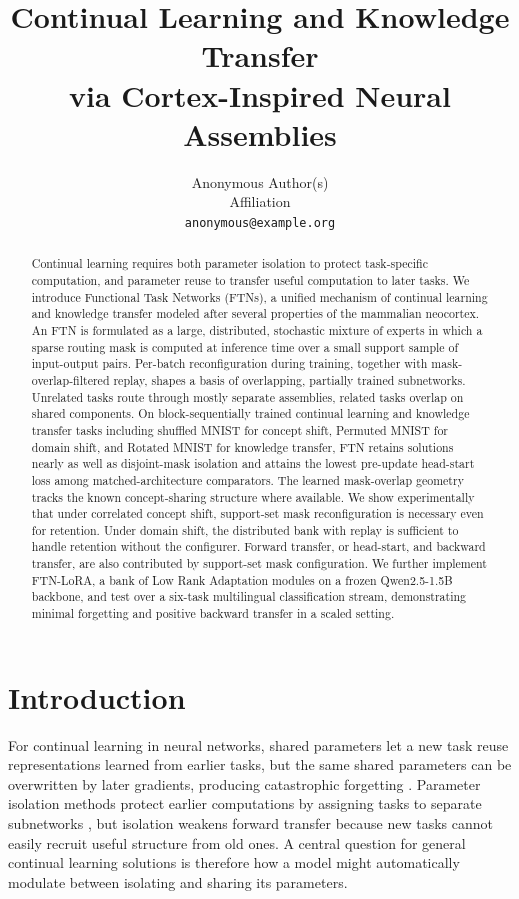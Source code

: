 \documentclass{article}
\title{Continual Learning and Knowledge Transfer\\ via Cortex-Inspired Neural Assemblies}
\author{%
  Anonymous Author(s)\\
  Affiliation\\
  \texttt{anonymous@example.org}\\
}
\begin{document}
\maketitle

\begin{abstract}
Continual learning requires both parameter isolation to protect task-specific computation, and parameter reuse to transfer useful computation to later tasks. We introduce Functional Task Networks (FTNs), a unified mechanism of continual learning and knowledge transfer modeled after several properties of the mammalian neocortex. An FTN is formulated as a large, distributed, stochastic mixture of experts in which a sparse routing mask is computed at inference time over a small support sample of input-output pairs. Per-batch reconfiguration during training, together with mask-overlap-filtered replay, shapes a basis of overlapping, partially trained subnetworks. Unrelated tasks route through mostly separate assemblies, related tasks overlap on shared components. On block-sequentially trained continual learning and knowledge transfer tasks including shuffled MNIST for concept shift, Permuted MNIST for domain shift, and Rotated MNIST for knowledge transfer, FTN retains solutions nearly as well as disjoint-mask isolation and attains the lowest pre-update head-start loss among matched-architecture comparators. The learned mask-overlap geometry tracks the known concept-sharing structure where available. We show experimentally that under correlated concept shift, support-set mask reconfiguration is necessary even for retention. Under domain shift, the distributed bank with replay is sufficient to handle retention without the configurer. Forward transfer, or head-start, and backward transfer, are also contributed by support-set mask configuration. We further implement FTN-LoRA, a bank of Low Rank Adaptation modules on a frozen Qwen2.5-1.5B backbone, and test over a six-task multilingual classification stream, demonstrating minimal forgetting and positive backward transfer in a scaled setting.
\end{abstract}

\section{Introduction}\label{sec:intro}

For continual learning in neural networks, shared parameters let a new task reuse representations learned from earlier tasks, but the same shared parameters can be overwritten by later gradients, producing catastrophic forgetting \citep{mccloskey1989catastrophic,french1999catastrophic}. Parameter isolation methods protect earlier computations by assigning tasks to separate subnetworks \citep{mallya2018packnet,serra2018overcoming,wortsman2020supermasks}, but isolation weakens forward transfer because new tasks cannot easily recruit useful structure from old ones. A central question for general continual learning solutions is therefore how a model might automatically modulate between isolating and sharing its parameters.
\end{document}
